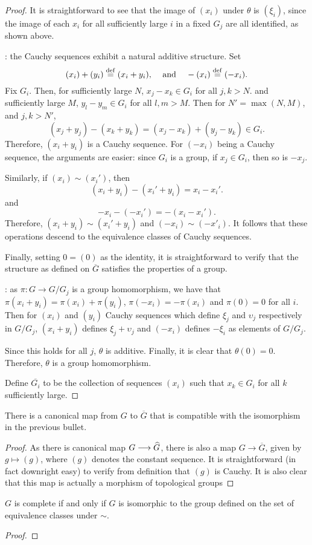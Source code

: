 \begin{proof}
It is straightforward to see that the image of $(x_i)$ under 
$\theta$ is $(\xi_i)$, since the image of each $x_i$ for all 
sufficiently large $i$ in a fixed $G_j$ are all identified, as 
shown above.

: the Cauchy sequences exhibit a natural additive structure. Set 
\[
(x_i) + (y_i) \stackrel{\mathrm{def}}{=} (x_i + y_i),\;\;\; \textrm{ and }\;\;\; 
   -(x_i) \stackrel{\mathrm{def}}{=} (-x_i).
\] 
Fix $G_i$. Then, for sufficiently large $N$, $x_j - x_k \in G_i$
for all $j, k > N$. and sufficiently large $M$, $y_l - y_m \in 
G_i$ for all $l, m > M$. Then for $N' = \max(N, M)$, and $j, k > 
N'$,
\[
(x_j + y_j) - (x_k + y_k) = (x_j - x_k) + (y_j - y_k) \in G_i.
\]
Therefore, $(x_i + y_i)$ is a Cauchy sequence. For $(-x_i)$ being
a Cauchy sequence, the arguments are easier: since $G_i$ is a 
group, if $x_j \in G_i$, then so is $-x_j$.

Similarly, if $(x_i) \sim (x_i')$, then 
\[
(x_i + y_i) - (x_i' + y_i) = x_i - x_i'.
\]
and 
\[
-x_i - (-x_i') = -(x_i - x_i').
\]
Therefore, $(x_i + y_i) \sim (x_i' + y_i)$ and $(-x_i) \sim 
(-x'_i)$. It follows that these operations descend to the 
equivalence classes of Cauchy sequences.

Finally, setting $0 = (0)$ as the identity, it is straightforward
to verify that the structure as defined on $\overline{G}$ 
satisfies the properties of a group.

 : as $\pi: G \to G/G_j$ 
is a group homomorphism, we have that $\pi(x_i + y_i) = \pi(x_i) 
+ \pi(y_i)$, $\pi(-x_i) = -\pi(x_i)$ and $\pi(0) = 0$ for all $i$. 
Then for $(x_i)$ and $(y_i)$ Cauchy sequences which define $\xi_j$
and $\upsilon_j$ respectively in $G/G_j$, $(x_i + y_i)$ defines 
$\xi_j + \upsilon_j$ and $(-x_i)$ defines $-\xi_i$ as elements of
$G/G_j$. 

Since this holds for all $j$, $\theta$ is additive. Finally, it
is clear that $\theta(0) = 0$. Therefore, $\theta$ is a group
homomorphism.

Define $\overline{G_i}$ to be the collection of sequences $(x_i)$
such that $x_k \in G_i$ for all $k$ sufficiently large.
\end{proof}

\begin{prop}
There is a canonical map from $G$ to $\overline{G}$ that is
compatible with the isomorphism in the previous bullet.
\end{prop}
\begin{proof}
As there is canonical map $G \longrightarrow \widehat{G}$, there is
also a map $G \to \overline{G}$, given by $g \mapsto (g)$, where
$(g)$ denotes the constant sequence. It is straightforward (in
fact downright easy) to verify from definition that $(g)$ is 
Cauchy. It is also clear that this map is actually a morphism of
topological groups
\end{proof}

\begin{cor}
$G$ is complete if and only if $G$ is isomorphic to the
group defined on the set of equivalence classes under $\sim$.
\end{cor}
\begin{proof}

\end{proof}
